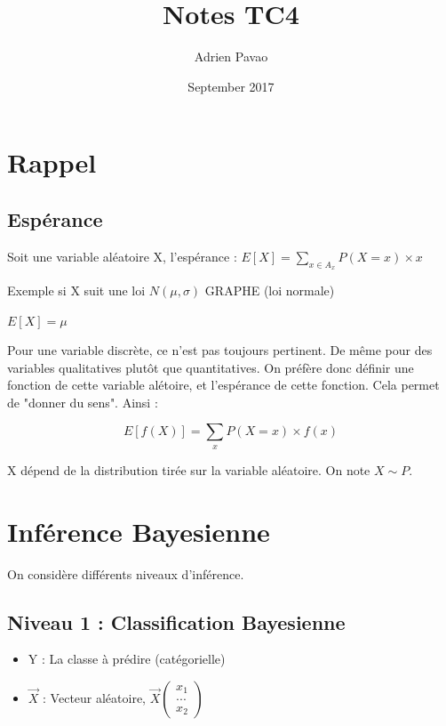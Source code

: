 \documentclass{article}
\title{Notes TC4}
\author{Adrien Pavao}
\date{September 2017}
\begin{document}
\maketitle

\tableofcontents

\section{Rappel}

\subsection{Espérance}

Soit une variable aléatoire X, l'espérance : $E[X] = \sum_{x \in A_x} P(X = x) \times x$

Exemple si X suit une loi $N(\mu, \sigma)$ GRAPHE (loi normale)

$E[X] = \mu$

Pour une variable discrète, ce n'est pas toujours pertinent. De même pour des variables qualitatives plutôt que quantitatives. On préfère donc définir une fonction de cette variable alétoire, et l'espérance de cette fonction. Cela permet de "donner du sens". Ainsi :

\[ E[f(X)] = \sum_x P(X = x) \times f(x) \]

X dépend de la distribution tirée sur la variable aléatoire. On note $X \sim P$.

\section{Inférence Bayesienne}

On considère différents niveaux d'inférence.

\subsection{Niveau 1 : Classification Bayesienne}

\begin{itemize}
\item Y : La classe à prédire (catégorielle)
\item $\vec{X}$ : Vecteur aléatoire, \( \vec{X} 
\begin{pmatrix} 
      x_1\\ 
      ...\\
      x_2 
\end{pmatrix} \)

\end{itemize}
\end{document}
